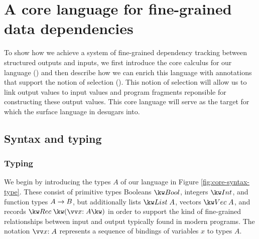 \newpage

\section{A core language for fine-grained data dependencies}
\label{sec:core-language}

To show how we achieve a system of fine-grained dependency tracking between structured outputs and inputs, we first introduce the core calculus for our language () and then describe how we can enrich this language with annotations that support the notion of selection (). This notion of selection will allow us to link output values to input values and program fragments reponsible for constructing these output values. This core language will serve as the target for which the surface language in  desugars into.

\subsection{Syntax and typing}
\label{sec:core-language:syntax-typing}
\subsubsection{Typing}
We begin by introducing the types $A$ of our language in Figure \ref{fig:core-syntax-type}. These consist of primitive types Booleans $\tyBool$, integers $\tyInt$, and function types ${A}\rightarrow{B}$, but additionally lists $\tyList{A}$, vectors $\tyVec{A}$, and records $\tyRec{\vec{\bind{x}{A}}}$ in order to support the kind of fine-grained relationships between input and output typically found in modern programs. The notation $\seq{\bind{x}{A}}$ represents a sequence of bindings of variables $x$ to types $A$.



